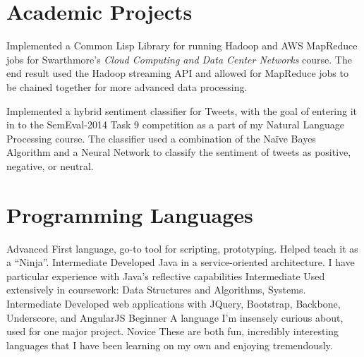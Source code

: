 \documentclass[11pt,letterpaper,sans]{moderncv}    %
\begin{document}
\section{Academic Projects}

       {Implemented a Common Lisp Library for running Hadoop and AWS
         MapReduce jobs for Swarthmore's \emph{Cloud Computing and 
         Data Center Networks} course. The end result used the Hadoop
         streaming API and allowed for MapReduce jobs to be chained 
         together for more advanced data processing.}

       {Implemented a hybrid sentiment classifier for Tweets, with the
         goal of entering it in to the SemEval-2014 Task 9 competition
         as a part of my Natural Language Processing course. The 
         classifier used a combination of the Na\"ive Bayes Algorithm 
         and a Neural Network to classify the sentiment of tweets as
         positive, negative, or neutral.}

\section{Programming Languages}
                  {Advanced}
                  {First language, go-to tool for scripting, 
                    prototyping. Helped teach it as a ``Ninja''.}
                  {Intermediate}
                  {Developed Java in a service-oriented architecture.
                    I have particular experience with Java's reflective 
                    capabilities }
                  {Intermediate}
                  {Used extensively in coursework: 
                    Data Structures and Algorithms, Systems.}
                  {Intermediate}
                  {Developed web applications with JQuery, Bootstrap, 
                    Backbone, Underscore, and AngularJS}
                  {Beginner}
                  {A language I'm insensely curious about, used for one
                    major project.}
                  {Novice}
                  {These are both fun, incredibly interesting languages 
                    that I have been learning on my own and enjoying
                    tremendously.}


\clearpage
\end{document}
